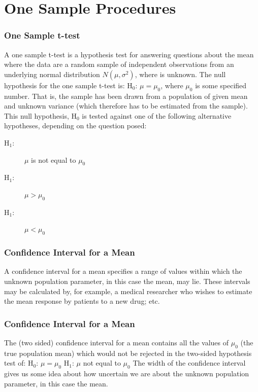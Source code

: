 \documentclass{beamer}
\begin{document}
\section{One Sample Procedures}
\begin{frame}
	\frametitle{One Sample t-test}
	A one sample t-test is a hypothesis test for answering questions
	about the mean where the data are a random sample of
	independent observations from an underlying normal distribution
	$N(\mu,\sigma^2 )$, where is unknown.
	The null hypothesis for the one sample t-test is:
	H$_0$: $\mu = \mu_0$, where $\mu_0$ is some specified number.
	That is, the sample has been drawn from a population of given
	mean and unknown variance (which therefore has to be estimated
	from the sample).
	This null hypothesis, H$_0$ is tested against one of the following
	alternative hypotheses, depending on the question posed:
	\begin{description}
		\item[H$_1$:] $\mu$ is not equal to $\mu_0$
		\item[H$_1$:] $\mu > \mu_0$
		\item[H$_1$:] $\mu < \mu_0$
	\end{description}	
\end{frame}
\begin{frame}
	\frametitle{Confidence Interval for a Mean}
	A confidence interval for a mean specifies a range of values within
	which the unknown population parameter, in this case the mean,
	may lie. These intervals may be calculated by, for example, a
	medical researcher who wishes to estimate the mean response by
	patients to a new drug; etc.
\end{frame}
\begin{frame}
	\frametitle{Confidence Interval for a Mean}	
	The (two sided) confidence interval for a mean contains all the
	values of $\mu_0$ (the true population mean) which would not be
	rejected in the two-sided hypothesis test of:
	H$_0$: $\mu = \mu_0$
	H$_1$: $\mu$ not equal to $\mu_0$
	The width of the confidence interval gives us some idea about how
	uncertain we are about the unknown population parameter, in this
	case the mean.
\end{frame}
\end{document}
